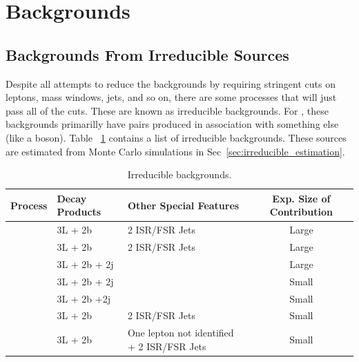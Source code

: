 	\section{Backgrounds}
	
	
	        		\subsection{Backgrounds From Irreducible Sources} 
	Despite all attempts to reduce the backgrounds by requiring stringent cuts on leptons, mass windows, jets, and so on, there are some processes that will just pass all of the cuts. These are known as irreducible backgrounds. For \ttZ, these backgrounds primarilly have \ttbar pairs produced in association with something else (like a boson). Table ~\ref{tab:irreducible_bkg} contains a list of irreducible backgrounds. These sources are estimated from Monte Carlo simulations in Sec~\ref{sec:irreducible_estimation}.
	\begin{table}[hbt]
	\begin{center}
	\begin{tabular}{l|ll|c}\hline\hline %
	Process & Decay Products & Other Special Features & Exp. Size of Contribution\\
	\hline
	\ttW & 3L + 2b& 2 ISR/FSR Jets& Large\\
	\tbZ & 3L + 2b& 2 ISR/FSR Jets & Large\\
	\ttH & 3L + 2b + 2j & & Large \\
	\ttG & 3L + 2b + 2j & & Small \\
	\ttWW & 3L + 2b +2j& & Small\\
	\WZZ & 3L + 2b & 2 ISR/FSR Jets & Small\\
	\ZZZ & 3L + 2b & One lepton not identified + 2 ISR/FSR Jets & Small\\
	
	\hline \hline
	\end{tabular}
	\caption{\label{tab:irreducible_bkg} Irreducible backgrounds.}
	\end{center}
	\end{table}
	
	
	
	
